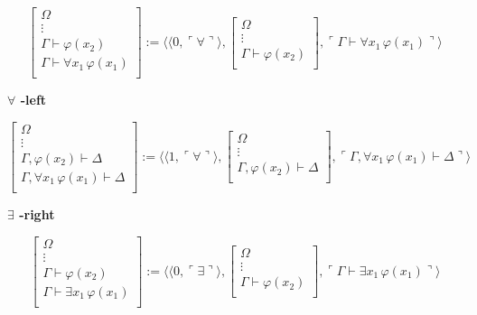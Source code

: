 $$
\left [
\begin{array}{c}
\Omega\\
\vdots\\
\Gamma \vdash \varphi(x_2)\\
\hline
\Gamma  \vdash \forall x_1\,\varphi(x_1)\\
\end{array}
\right ]
:= \langle \langle 0,\ulcorner \forall \urcorner \rangle ,
\left [
\begin{array}{c}
\Omega\\
\vdots\\
\Gamma \vdash \varphi(x_2)\\
\end{array}
\right ],
\ulcorner \Gamma \vdash \forall x_1\,\varphi(x_1) \urcorner \rangle
$$

\vspace{0.5cm}

\textbf{$\forall$ -left}

$$
\left [
\begin{array}{c}
\Omega\\
\vdots\\
\Gamma, \varphi(x_2) \vdash \Delta\\
\hline
\Gamma, \forall x_1\,\varphi(x_1) \vdash \Delta\\
\end{array}
\right ]
:= \langle \langle 1,\ulcorner \forall \urcorner \rangle ,
\left [
\begin{array}{c}
\Omega\\
\vdots\\
\Gamma, \varphi(x_2) \vdash \Delta\\
\end{array}
\right ],
\ulcorner \Gamma, \forall x_1\,\varphi(x_1) \vdash \Delta \urcorner \rangle
$$

\vspace{0.5cm}

\textbf{$\exists$ -right}

$$
\left [
\begin{array}{c}
\Omega\\
\vdots\\
\Gamma \vdash \varphi(x_2)\\
\hline
\Gamma  \vdash \exists x_1\,\varphi(x_1)\\
\end{array}
\right ]
:= \langle \langle 0,\ulcorner \exists \urcorner \rangle ,
\left [
\begin{array}{c}
\Omega\\
\vdots\\
\Gamma \vdash \varphi(x_2)\\
\end{array}
\right ],
\ulcorner \Gamma \vdash \exists x_1\,\varphi(x_1) \urcorner \rangle
$$

